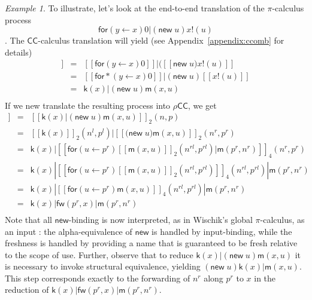 \documentclass[submission,copyright,creativecommons]{eptcs}
\newcommand{\new}{\mathsf{new}}
\newcommand{\pic}{$\pi$-calculus}
\newcommand{\ccomb}{$\mathsf{CC}$-calculus}
\newcommand{\ldb}{[\![}
\newcommand{\rdb}{]\!]}
\newcommand{\binpar}[2]{#1 | #2}
\newcommand{\prefix}[3]{\mathsf{for}(#2 \leftarrow #1) #3}
\newcommand{\prefixst}[3]{\mathsf{for*}(#2 \leftarrow #1) #3}
\newcommand{\meaningof}[1]{\ldb #1 \rdb}
\newcommand{\rhocc}{$\rho$$\mathsf{CC}$}
\theoremstyle{definition}
\theoremstyle{remark}
\theoremstyle{remark}
\newtheorem{example}{Example}
\begin{document}
\begin{example}
  To illustrate, let's look at the end-to-end translation of the {\pic} process
  \[\binpar{\prefix{x}{y}{0}}{(\mathsf{new}\;u)x!(u)}\].
  The {\ccomb} translation will yield (see Appendix~\ref{appendix:ccomb} for details)
\begin{eqnarray*}
  \meaningof{\binpar{\prefix{x}{y}{0}}{(\mathsf{new}\;u)x!(u)}} & = & \binpar{\meaningof{\prefix{x}{y}{0}}}{(\meaningof{\mathsf{new}\;u)x!(u)}} \\
  & = & \binpar{\meaningof{\prefixst{x}{y}{0}}}{(\mathsf{new}\;u)\meaningof{x!(u)}} \\
  & = & \binpar{\mathsf{k}(x)}{(\mathsf{new}\;u)\mathsf{m}(x,u)} \\
\end{eqnarray*}
If we new translate the resulting process into {\rhocc}, we get
\begin{eqnarray*}
  \meaningof{\binpar{\mathsf{k}(x)}{(\mathsf{new}\;u)\mathsf{m}(x,u)}} & = & \meaningof{\binpar{\mathsf{k}(x)}{(\mathsf{new}\;u)\mathsf{m}(x,u)}}_{2}(n,p)\\
  & = & \binpar{\meaningof{\mathsf{k}(x)}_{2}(n^{l},p^{l})}{\meaningof{\mathsf{(new}\;u)\mathsf{m}(x,u)}_{2}(n^{r},p^{r})} \\
  & = & \binpar{\mathsf{k}(x)}{\meaningof{\binpar{\prefix{p^{r}}{u}{\meaningof{\mathsf{m}(x,u)}_{2}(n^{rl},p^{rl})}}{\mathsf{m}(p^{r},n^{r})}}_{4}(n^{r},p^{r})} \\
  & = & \binpar{\mathsf{k}(x)}{\binpar{\meaningof{\prefix{p^{r}}{u}{\meaningof{\mathsf{m}(x,u)}_{2}(n^{rl},p^{rl})}}_{4}(n^{rl},p^{rl})}{\mathsf{m}(p^{r},n^{r})}} \\
  & = & \binpar{\mathsf{k}(x)}{\binpar{\meaningof{\prefix{p^{r}}{u}{\mathsf{m}(x,u)}}_{4}(n^{rl},p^{rl})}{\mathsf{m}(p^{r},n^{r})}} \\
  & = & \binpar{\mathsf{k}(x)}{\binpar{\mathsf{fw}(p^{r},x)}{\mathsf{m}(p^{r},n^{r})}} \\
\end{eqnarray*}
Note that all $\new$-binding is now interpreted, as in Wischik's
global $\pi$-calculus, as an input \cite{globalpi}: the
alpha-equivalence of $\new$ is handled by input-binding, while the
freshness is handled by providing a name that is guaranteed to be
fresh relative to the scope of use. Further, observe that to reduce
$\binpar{\mathsf{k}(x)}{(\mathsf{new}\;u)\mathsf{m}(x,u)}$ it is
necessary to invoke structural equivalence, yielding
$(\mathsf{new}\;u)\binpar{\mathsf{k}(x)}{\mathsf{m}(x,u)}$. This step
corresponds exactly to the forwarding of $n^{r}$ along $p^{r}$ to $x$ in the
reduction of
$\binpar{\mathsf{k}(x)}{\binpar{\mathsf{fw}(p^{r},x)}{\mathsf{m}(p^{r},n^{r})}}$.
\end{example}
\end{document}

